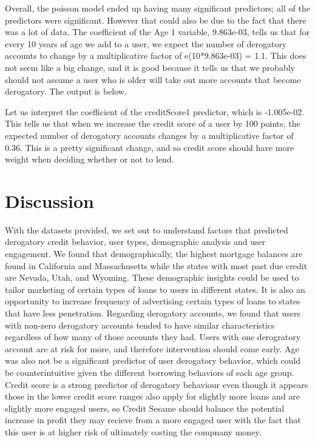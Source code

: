 \documentclass[11pt]{llncs}
\begin{document}
\normalsize 
Overall, the poisson model ended up having many significant predictors; all of the predictors were significant. However that could also be due to the fact that there was a lot of data. The coefficient of the Age 1 variable, 9.863e-03, tells us that for every 10 years of age we add to a user, we expect the number of derogatory accounts to change by a multiplicative factor of e(10*9.863e-03) = 1.1. This does not seem like a big change, and it is good because it tells us that we probably should not assume a user who is older will take out more accounts that become derogatory. The output is below.

Let us interpret the coefficient of the creditScore1 predictor, which is -1.005e-02. This tells us that when we increase the credit score of a user by 100 points, the expected number of derogatory accounts changes by a multiplicative factor of 0.36. This is a pretty significant change, and so credit score should have more weight when deciding whether or not to lend.

\section{Discussion}
\label{sec:discussion}
With the datasets provided, we set out to understand factors that predicted derogatory credit behavior, user types,  demographic analysis  and user engagement. We found that demographically, the highest mortgage balances are found in California and Massachusetts while the states with most past due credit are Nevada, Utah, and Wyoming. These demographic insights could be used to tailor marketing of certain types of loans to users in different states. It is also an opportunity to increase frequency of advertising certain types of loans to states that have less penetration. Regarding derogatory accounts, we found that users with non-zero derogatory accounts tended to have similar characteristics regardless of how many of those accounts they had. Users with one derogratory account are at risk for more, and therefore intervention should come early. Age was also not be a significant predictor of user derogatory behavior, which could be counterintuitive given the different borrowing behaviors of each age group. Credit score is a strong predictor of derogatory behaviour even though it appears those in the lower credit score ranges also apply for slightly more loans and are slightly more engaged users, so Credit Sesame should balance the potential increase in profit they may recieve from a more engaged user with the fact that this user is at higher risk of ultimately costing the compnany money.
\end{document}
